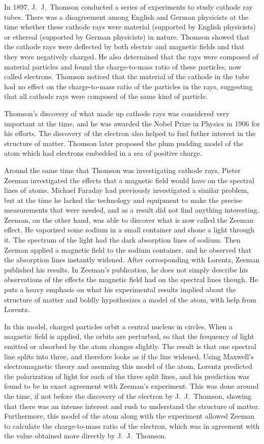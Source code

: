 \documentclass[12pt, oneside, letterpaper, fleqn]{article}
\begin{document}
In 1897, J.\ J.\ Thomson conducted a series of experiments to study
cathode ray tubes. There was a disagreement among English and German
physicists at the time whether these cathode rays were material
(supported by English physicists) or ethereal (supported by German
physicists) in nature. Thomson showed that the cathode rays were
deflected by both electric and magnetic fields and that they were
negatively charged. He also determined that the rays were composed of
material particles and found the charge-to-mass ratio of these
particles, now called electrons. Thomson noticed that the material of
the cathode in the tube had no effect on the charge-to-mass ratio of the
particles in the rays, suggesting that all cathode rays were composed of
the same kind of particle. 

Thomson's discovery of what made up cathode rays was considered very
important at the time, and he was awarded the Nobel Prize in Physics in
1906 for his efforts. The discovery of the electron also helped to fuel
futher interest in the structure of matter. Thomson later proposed the
plum pudding model of the atom which had electrons embedded in a sea of
positive charge.

Around the same time that Thomson was investigating cathode rays, Pieter
Zeeman investigated the effects that a magnetic field would have on the
spectral lines of atoms. Michael Faraday had previously investigated a
similar problem, but at the time he lacked the technology and equipment
to make the precise measurements that were needed, and as a result did
not find anything interesting.  Zeeman, on the other hand, was able to
discover what is now called the Zeeman effect. He vaporized some sodium
in a small container and shone a light through it. The spectrum of the
light had the dark absorption lines of sodium. Then Zeeman applied a
magnetic field to the sodium container, and he observed that the
absorption lines instantly widened.  After corresponding with Lorentz,
Zeeman published his results.  In Zeeman's publication, he does not
simply describe his observations of the effects the magnetic field had
on the spectral lines though. He puts a heavy emphasis on what his
experimental results implied about the structure of matter and boldly
hypothesizes a model of the atom, with help from Lorentz.

In this model, charged particles orbit a central nucleus in circles.
When a magnetic field is applied, the orbits are perturbed, so that the
frequency of light emitted or absorbed by the atom changes slightly. The
result is that one spectral line splits into three, and therefore looks
as if the line widened. Using Maxwell's electromagnetic theory and
assuming this model of the atom, Lorentz predicted the polarization of
light for each of the three split lines, and his prediction was found to
be in exact agreement with Zeeman's experiment. This was done around the
time, if not before the discovery of the electron by J.\ J.\ Thomson,
showing that there was an intense interest and rush to understand the
structure of matter. Furthermore, this model of the atom along with the
experiment allowed Zeeman to calculate the charge-to-mass ratio of the
electron, which was in agreement with the value obtained more directly
by J.\ J.\ Thomson.
\end{document}
